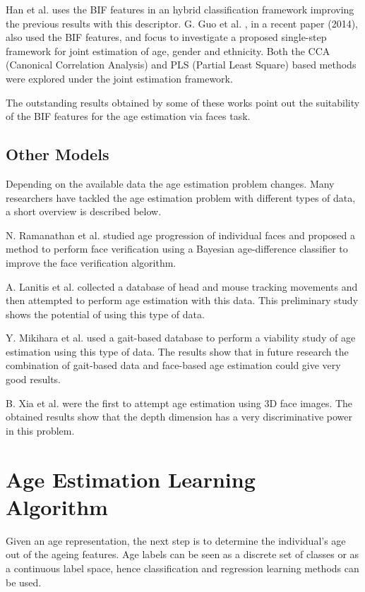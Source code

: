 Han et al. \cite{han:age} uses the BIF features in an hybrid classification framework improving the previous results with this descriptor. G. Guo et al. \cite{Guo2014761}, in a recent paper (2014), also used the BIF features, and focus to investigate a proposed single-step framework for joint estimation of age, gender and ethnicity. Both the CCA (Canonical Correlation Analysis) \cite{hotelling1936relations} and PLS (Partial Least Square) based methods were explored under the joint estimation framework.

The outstanding results obtained by some of these works point out the suitability of the BIF features for the age estimation via faces task.

\subsection{Other Models}

Depending on the available data the age estimation problem changes. Many researchers have tackled the age estimation problem with different types of data, a short overview is described below.

N. Ramanathan et al. \cite{1709980} studied age progression of individual faces and proposed a method to perform face verification using a Bayesian age-difference classifier to improve the face verification algorithm.

A. Lanitis et al. \cite{5463396} collected a database of head and mouse tracking movements and then attempted to perform age estimation with this data. This preliminary study shows the potential of using this type of data.

Y. Mikihara et al. \cite{6117531} used a gait-based database to perform a viability study of age estimation using this type of data. The results show that in future research the combination of gait-based data and face-based age estimation could give very good results.

B. Xia et al. \cite{xia:hal-00904007} were the first to attempt age estimation using 3D face images. The obtained results show that the depth dimension has a very discriminative power in this problem. 

\section{Age Estimation Learning Algorithm}
Given an age representation, the next step is to determine the individual's age out of the ageing features. Age labels can be seen as a discrete set of classes or as a continuous label space, hence classification and regression learning methods can be used.

